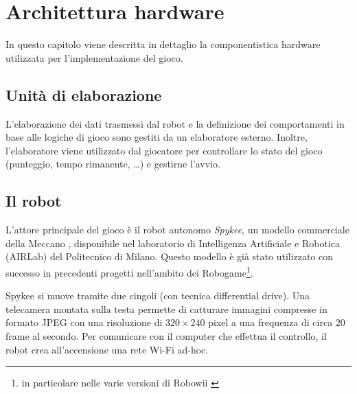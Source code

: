 \chapter{Architettura hardware}
\label{cap:architettura}

In questo capitolo viene descritta in dettaglio la componentistica hardware utilizzata per l'implementazione del gioco.

\section{Unità di elaborazione}
L'elaborazione dei dati trasmessi dal robot e la definizione dei comportamenti in base alle logiche di gioco sono gestiti da un elaboratore esterno. Inoltre, l'elaboratore viene utilizzato dal giocatore per controllare lo stato del gioco (punteggio, tempo rimanente, \dots) e gestirne l'avvio.

\section{Il robot}

L'attore principale del gioco è il robot autonomo \emph{Spykee}, un modello commerciale della Meccano \cite{spykeeweb}, disponibile nel laboratorio di Intelligenza Artificiale e Robotica (AIRLab) del Politecnico di Milano. Questo modello è già stato utilizzato con successo in precedenti progetti nell'ambito dei Robogame\footnote{in particolare nelle varie versioni di Robowii \cite{robowii} }.

Spykee si muove tramite due cingoli (con tecnica differential drive). Una telecamera montata sulla testa permette di catturare immagini compresse in formato JPEG con una risoluzione di $320 \times 240$ pixel a una frequenza di circa $20$ frame al secondo. Per comunicare con il computer che effettua il controllo, il robot crea all'accensione una rete Wi-Fi ad-hoc.


